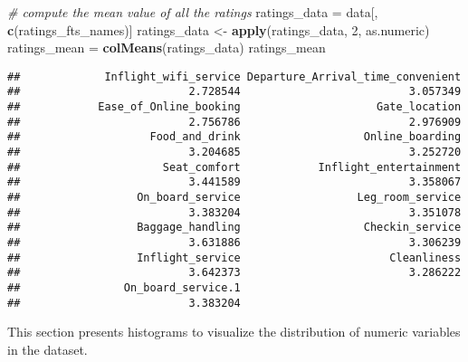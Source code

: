 \documentclass[
]{article}
\newenvironment{Shaded}{\begin{snugshade}}{\end{snugshade}}
\newcommand{\CommentTok}[1]{\textcolor[rgb]{0.56,0.35,0.01}{\textit{#1}}}
\newcommand{\DecValTok}[1]{\textcolor[rgb]{0.00,0.00,0.81}{#1}}
\newcommand{\FunctionTok}[1]{\textcolor[rgb]{0.13,0.29,0.53}{\textbf{#1}}}
\newcommand{\NormalTok}[1]{#1}
\newcommand{\OtherTok}[1]{\textcolor[rgb]{0.56,0.35,0.01}{#1}}
\begin{document}
\begin{Shaded}
\begin{Highlighting}[]
\CommentTok{\# compute the mean value of all the ratings}
\NormalTok{ratings\_data }\OtherTok{=}\NormalTok{ data[, }\FunctionTok{c}\NormalTok{(ratings\_fts\_names)]}
\NormalTok{ratings\_data }\OtherTok{\textless{}{-}} \FunctionTok{apply}\NormalTok{(ratings\_data, }\DecValTok{2}\NormalTok{, as.numeric)}
\NormalTok{ratings\_mean }\OtherTok{=} \FunctionTok{colMeans}\NormalTok{(ratings\_data)}
\NormalTok{ratings\_mean}
\end{Highlighting}
\end{Shaded}

\begin{verbatim}
##             Inflight_wifi_service Departure_Arrival_time_convenient 
##                          2.728544                          3.057349 
##            Ease_of_Online_booking                     Gate_location 
##                          2.756786                          2.976909 
##                    Food_and_drink                   Online_boarding 
##                          3.204685                          3.252720 
##                      Seat_comfort            Inflight_entertainment 
##                          3.441589                          3.358067 
##                  On_board_service                  Leg_room_service 
##                          3.383204                          3.351078 
##                  Baggage_handling                   Checkin_service 
##                          3.631886                          3.306239 
##                  Inflight_service                       Cleanliness 
##                          3.642373                          3.286222 
##                On_board_service.1 
##                          3.383204
\end{verbatim}

This section presents histograms to visualize the distribution of
numeric variables in the dataset.
\end{document}
